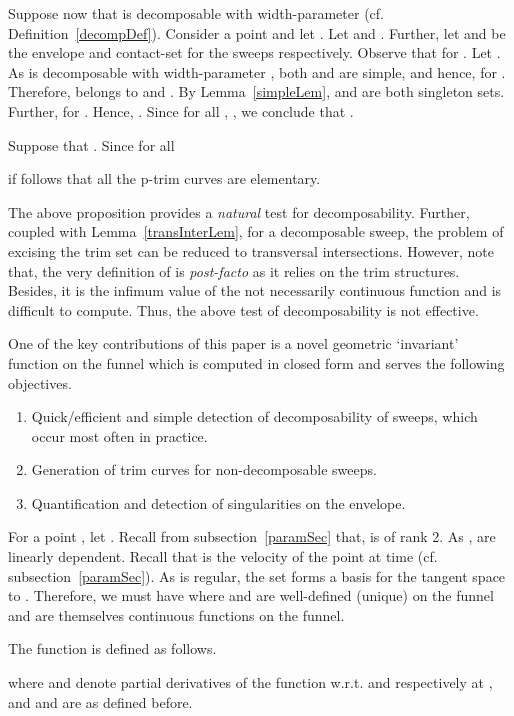 \documentclass{elsart5p}
\begin{document}
Suppose now that  is decomposable with width-parameter  
(cf. Definition~\ref{decompDef}).
Consider a point  and 
let .  
Let  and . Further,
let  and  be the envelope and contact-set for the
sweeps  respectively. Observe that 
 for .
Let .
As  is decomposable with width-parameter ,
both  and  are simple, and hence,
 for . Therefore, 
 belongs to   and .
By Lemma~\ref{simpleLem}, 
 and  are both singleton sets.  
Further,  for 
.  Hence, .  Since for all ,
, we conclude that .

Suppose that .  Since  for all 
 
if follows that all the p-trim curves are elementary.
\hfill 


The above proposition provides a {\em natural} test for decomposability. Further, coupled
with Lemma~\ref{transInterLem}, for a decomposable sweep, the problem of
excising the trim set can be reduced to transversal intersections. However,
note that, the very definition of  is {\em post-facto} as it 
relies on the trim structures.
Besides, it is the infimum value of the 
not necessarily continuous function  and is difficult to compute. Thus, 
the above test of decomposability is not effective.

One of the key contributions of this paper is a novel geometric 
`invariant' function on the funnel which is computed in closed form and 
serves the following objectives.
\begin{enumerate}
\item Quick/efficient and simple detection of decomposability of sweeps, which occur most often in practice.
\item Generation of trim curves for non-decomposable sweeps.
\item Quantification and detection of singularities on the envelope.
\end{enumerate}

For a point , let . 
Recall from subsection~\ref{paramSec} that,  is of rank 2.
As ,  are linearly dependent. 
Recall that  is the velocity of the point  at time  (cf. subsection~\ref{paramSec}).
As  is regular, the set  forms a basis for the tangent space to .
Therefore, we must have  where  and  are well-defined (unique) on the funnel and are themselves continuous functions on the funnel.


\begin{defn} \label{thetaDef}
The function  is defined as follows.

where  and  denote partial derivatives of the function  w.r.t.  and  respectively at , and  and  are as defined before.
\end{defn}
\end{document}
